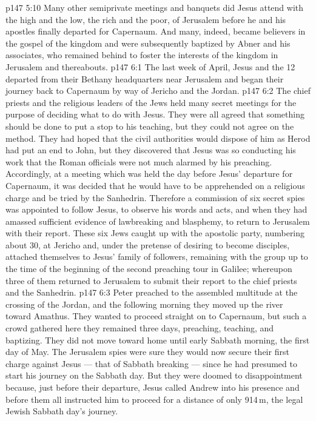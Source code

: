 \vs p147 5:10 \pc Many other semiprivate meetings and banquets did Jesus attend with the high and the low, the rich and the poor, of Jerusalem before he and his apostles finally departed for Capernaum. And many, indeed, became believers in the gospel of the kingdom and were subsequently baptized by Abner and his associates, who remained behind to foster the interests of the kingdom in Jerusalem and thereabouts.
\vs p147 6:1 The last week of April, Jesus and the 12 departed from their Bethany headquarters near Jerusalem and began their journey back to Capernaum by way of Jericho and the Jordan.
\vs p147 6:2 The chief priests and the religious leaders of the Jews held many secret meetings for the purpose of deciding what to do with Jesus. They were all agreed that something should be done to put a stop to his teaching, but they could not agree on the method. They had hoped that the civil authorities would dispose of him as Herod had put an end to John, but they discovered that Jesus was so conducting his work that the Roman officials were not much alarmed by his preaching. Accordingly, at a meeting which was held the day before Jesus’ departure for Capernaum, it was decided that he would have to be apprehended on a religious charge and be tried by the Sanhedrin. Therefore a commission of six secret spies was appointed to follow Jesus, to observe his words and acts, and when they had amassed sufficient evidence of lawbreaking and blasphemy, to return to Jerusalem with their report. These six Jews caught up with the apostolic party, numbering about 30, at Jericho and, under the pretense of desiring to become disciples, attached themselves to Jesus’ family of followers, remaining with the group up to the time of the beginning of the second preaching tour in Galilee; whereupon three of them returned to Jerusalem to submit their report to the chief priests and the Sanhedrin.
\vs p147 6:3 \pc Peter preached to the assembled multitude at the crossing of the Jordan, and the following morning they moved up the river toward Amathus. They wanted to proceed straight on to Capernaum, but such a crowd gathered here they remained three days, preaching, teaching, and baptizing. They did not move toward home until early Sabbath morning, the first day of May. The Jerusalem spies were sure they would now secure their first charge against Jesus --- that of Sabbath breaking --- since he had presumed to start his journey on the Sabbath day. But they were doomed to disappointment because, just before their departure, Jesus called Andrew into his presence and before them all instructed him to proceed for a distance of only 914\,m, the legal Jewish Sabbath day’s journey.
